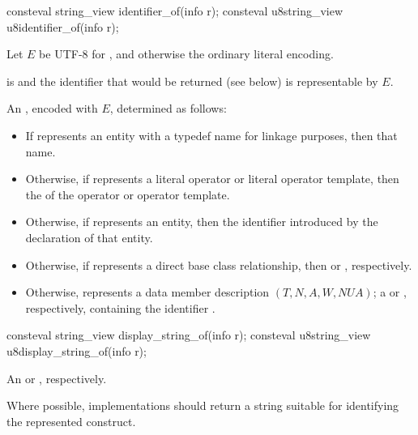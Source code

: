 %
%
\begin{itemdecl}
consteval string_view identifier_of(info r);
consteval u8string_view u8identifier_of(info r);
\end{itemdecl}

\begin{itemdescr}
\pnum
Let $E$ be UTF-8 for ,
and otherwise the ordinary literal encoding.

\pnum
\constantwhen
{} is 
and the identifier that would be returned (see below)
is representable by $E$.

\pnum
\returns
An \ntmbs{}, encoded with $E$,
determined as follows:
\begin{itemize}
\item
  If  represents an entity with a typedef name for linkage purposes,
  then that name.
\item
  Otherwise, if  represents a literal operator or literal operator template,
  then the  of the operator or operator template.
\item
  Otherwise, if  represents an entity,
  then the identifier introduced by the declaration of that entity.
\item
  Otherwise, if  represents a direct base class relationship,
  then  or ,
  respectively.
\item
  Otherwise,  represents a data member description
  $(T, N, A, W, NUA)$;
  a  or , respectively,
  containing the identifier .
\end{itemize}
\end{itemdescr}

%
%
\begin{itemdecl}
consteval string_view display_string_of(info r);
consteval u8string_view u8display_string_of(info r);
\end{itemdecl}

\begin{itemdescr}
\pnum
\returns
An
 or , respectively.

\pnum
\recommended
Where possible,
implementations should return a string
suitable for identifying the represented construct.
\end{itemdescr}

